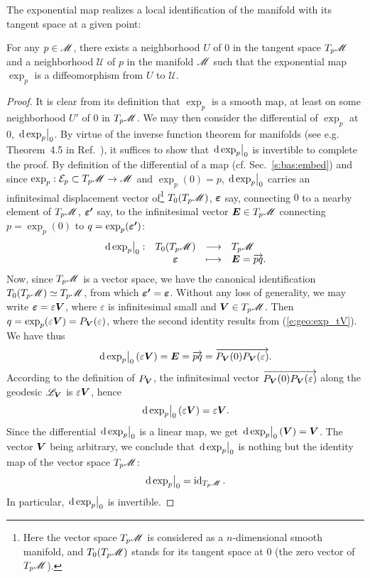 The exponential map realizes a local identification of the manifold
with its tangent space at a given point:
\begin{prop}
\label{p:geo:exp_diffeo}
For any $p\in\mathscr{M}$, there exists a neighborhood $U$ of $0$ in the tangent
space $T_p\mathscr{M}$ and a neighborhood $\mathscr{U}$ of $p$ in the manifold $\mathscr{M}$
such that the exponential map $\exp_p$ is a diffeomorphism from
$U$ to $\mathscr{U}$.
\end{prop}
\begin{proof}
It is clear from its definition that $\exp_p$ is a smooth map, at least
on some neighborhood $U'$ of $0$ in $T_p\mathscr{M}$. We may then consider the
differential of $\exp_p$ at $0$, $\left.\mathrm{d}\exp_p\right| _0$.
By virtue of the inverse function theorem for manifolds (see e.g. Theorem~4.5 in
Ref.~\cite{Lee13}), it suffices to show that
$\left.\mathrm{d}\exp_p\right| _0$ is invertible to complete the proof.
By definition of the differential of a map (cf. Sec.~\ref{s:bas:embed})
and since $\exp_p: \mathcal{E}_p \subset T_p\mathscr{M} \to \mathscr{M}$
and $\exp_p(0) = p$, $\left.\mathrm{d}\exp_p\right| _0$ carries an
infinitesimal displacement vector of\footnote{Here the vector space $T_p\mathscr{M}$ is considered
as a $n$-dimensional smooth manifold, and $T_0(T_p\mathscr{M})$ stands for its tangent space
at $0$ (the zero vector of $T_p\mathscr{M}$).} $T_0(T_p\mathscr{M})$, $\bm{\varepsilon}$ say, connecting $0$ to a nearby element of $T_p\mathscr{M}$, $\bm{\varepsilon'}$ say,
to the infinitesimal vector $\bm{E}\in T_p\mathscr{M}$ connecting
$p=\exp_p(0)$ to $q=\exp_p(\bm{\varepsilon'})$:
\[
    \begin{array}{cccl}
    \left.\mathrm{d}\exp_p\right| _0: & T_0(T_p\mathscr{M}) & \longrightarrow & T_p\mathscr{M} \\
        & \bm{\varepsilon} & \longmapsto & \bm{E} = \overrightarrow{pq}.
    \end{array}
\]
Now, since $T_p\mathscr{M}$ is a vector space, we have the canonical identification
$T_0(T_p\mathscr{M}) \simeq T_p\mathscr{M}$, from which $\bm{\varepsilon'} = \bm{\varepsilon}$.
Without any loss of generality, we may write $\bm{\varepsilon} = \varepsilon \bm{V}$,
where $\varepsilon$ is infinitesimal small and $\bm{V}\in T_p\mathscr{M}$. Then
$q = \exp_p(\varepsilon \bm{V}) = P_{\bm{V}}(\varepsilon)$, where the second
identity results from (\ref{e:geo:exp_tV}). We have thus
\[
    \left.\mathrm{d}\exp_p\right| _0(\varepsilon \bm{V}) = \bm{E} = \overrightarrow{pq} =
    \overrightarrow{P_{\bm{V}}(0) P_{\bm{V}}(\varepsilon)} .
\]
According to the definition of $P_{\bm{V}}$, the infinitesimal vector
$\overrightarrow{P_{\bm{V}}(0) P_{\bm{V}}(\varepsilon)}$ along the geodesic $\mathscr{L}_{\bm{V}}$
is $\varepsilon \bm{V}$, hence
\[
    \left.\mathrm{d}\exp_p\right| _0(\varepsilon \bm{V}) = \varepsilon \bm{V} .
\]
Since the differential $\left.\mathrm{d}\exp_p\right| _0$ is a linear map, we
get $\left.\mathrm{d}\exp_p\right| _0(\bm{V}) = \bm{V}$. The vector $\bm{V}$ being arbitrary,
we conclude that $\left.\mathrm{d}\exp_p\right| _0$ is nothing but the identity map of
the vector space $T_p\mathscr{M}$:
\[
    \left.\mathrm{d}\exp_p\right| _0 = \operatorname{id}_{T_p\mathscr{M}} .
\]
In particular, $\left.\mathrm{d}\exp_p\right| _0$ is invertible.
\end{proof}

